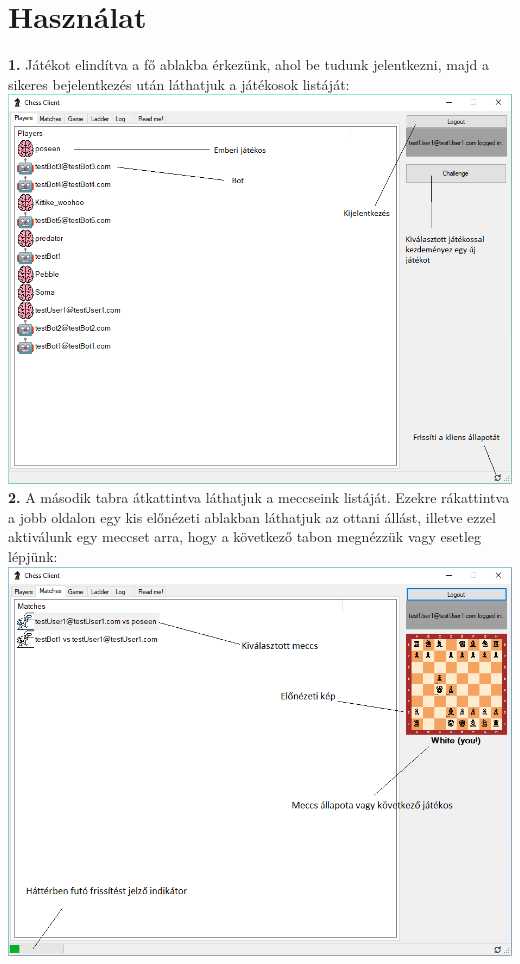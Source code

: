 \documentclass[twoside, a4paper, 12pt]{book}
\begin{document}
\section{Használat}
\noindent \textbf{1.} Játékot elindítva a fő ablakba érkezünk, ahol be tudunk jelentkezni, majd a sikeres bejelentkezés után láthatjuk a játékosok listáját: \\
\includegraphics[width=1.0\textwidth]{img/chessClient_1.png} \\

\noindent \textbf{2.} A második tabra átkattintva láthatjuk a meccseink listáját. Ezekre rákattintva a jobb oldalon egy kis előnézeti ablakban láthatjuk az ottani állást, illetve ezzel aktiválunk egy meccset arra, hogy a következő tabon megnézzük vagy esetleg lépjünk: \\
\includegraphics[width=1.0\textwidth]{img/chessClient_2.png} \\
\end{document}
